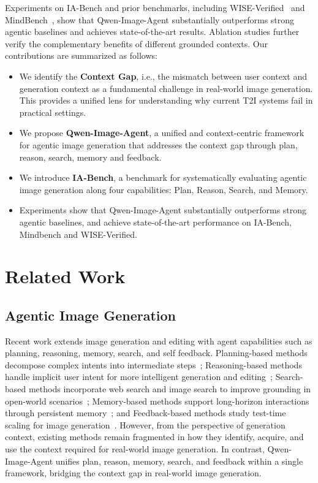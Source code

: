 \documentclass{llmxive}
\begin{document}
Experiments on IA-Bench and prior benchmarks, including WISE-Verified~\citep{Niu2025WISEAW} and MindBench~\citep{He2026MindBrushIA}, show that Qwen-Image-Agent substantially outperforms strong agentic baselines and achieves state-of-the-art results. Ablation studies further verify the complementary benefits of different grounded contexts. Our contributions are summarized as follows:
\begin{itemize}[leftmargin=*, itemsep=2pt, topsep=2pt, parsep=0pt, partopsep=0pt]
\item We identify the \textbf{Context Gap}, i.e., the mismatch between user context and generation context as a fundamental challenge in real-world image generation. This provides a unified lens for understanding why current T2I systems fail in practical settings.
\item We propose \textbf{Qwen-Image-Agent}, a unified and context-centric framework for agentic image generation that addresses the context gap through plan, reason, search, memory and feedback.
\item We introduce \textbf{IA-Bench}, a benchmark for systematically evaluating agentic image generation along four capabilities: Plan, Reason, Search, and Memory.
\item Experiments show that Qwen-Image-Agent substantially outperforms strong agentic baselines, and achieve state-of-the-art performance on IA-Bench, Mindbench and WISE-Verified.
\end{itemize}
\section{Related Work}

\subsection{Agentic Image Generation}

Recent work extends image generation and editing with agent capabilities such as planning, reasoning, memory, search, and self feedback. Planning-based methods decompose complex intents into intermediate steps~\citep{Yao2026PhotoAgentAP}; Reasoning-based methods handle implicit user intent for more intelligent generation and editing~\citep{He2026MindBrushIA}; Search-based methods incorporate web search and image search to improve grounding in open-world scenarios~\citep{Feng2026GenSearcherRA,He2026MindBrushIA}; Memory-based methods support long-horizon interactions through persistent memory~\citep{He2026GEMSAM}; and Feedback-based methods study test-time scaling for image generation~\citep{Jiang2026GenAgentST,Wang2025ImAgentAU}. However, from the perspective of generation context, existing methods remain fragmented in how they identify, acquire, and use the context required for real-world image generation. In contrast, Qwen-Image-Agent unifies plan, reason, memory, search, and feedback within a single framework, bridging the context gap in real-world image generation.
\end{document}
